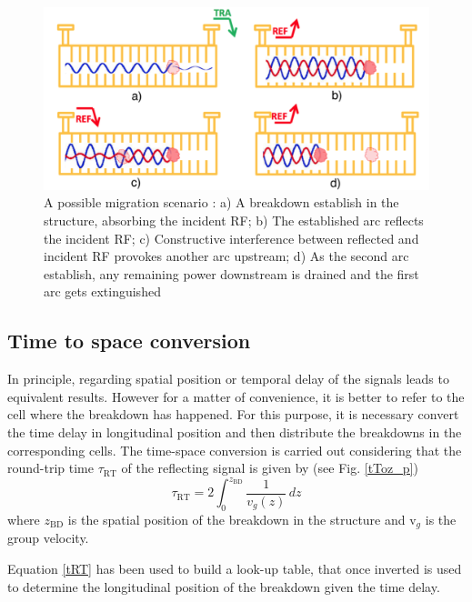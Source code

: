 \begin{figure}[h]
\centering 
\includegraphics[scale=0.3]{pictures/migration_scenario}
\caption{A possible migration scenario \cite{Degiovanni:migration}: a) A breakdown establish in the structure, absorbing the incident RF; b) The established arc reflects the incident RF; c) Constructive interference between reflected and incident RF provokes another arc upstream; d) As the second arc establish, any remaining power downstream is drained and the first arc gets extinguished}
\label{mig_sc}
\end{figure}






\subsection[Time to space conversion]{Time to space conversion}

In principle, regarding spatial position or temporal delay of the signals leads to equivalent results. However for a matter of convenience, it is better to refer to the cell where the breakdown has happened. For this purpose, it is necessary convert the time delay in longitudinal position and then distribute the breakdowns in the corresponding cells. The time-space conversion is carried out considering that the round-trip time $\tau_{\text{RT}}$  of the reflecting signal is given by (see Fig. \ref{tToz_p})
\begin{equation}
\tau_{\text{RT}} = 2 \int_0^{z_{\text{BD}}} \frac{1}{v_g (z)} \, dz
\label{tRT}
\end{equation}
where $z_{\text{BD}}$ is the spatial position of the breakdown in the structure and v$_g$ is the group velocity.

Equation \ref{tRT} has been used to build a look-up table, that once inverted is used to determine the longitudinal position of the breakdown given the time delay.


